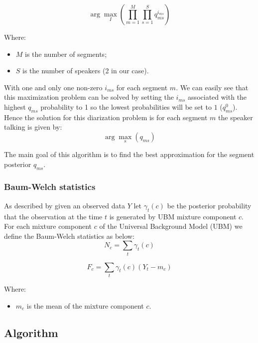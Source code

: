 \documentclass{techrep} %
\begin{document}
\begin{equation}\label{eq3}
  \arg\max_{I}(\prod_{m=1}^{M}{\prod_{s=1}^{S}{q_{ms}^{i_{ms}}}})
\end{equation}

Where:
\begin{itemize}
\item $M$ is the number of segments;
\item $S$ is the number of speakers (2 in our case).
\end{itemize}

With one and only one non-zero $i_{ms}$ for each segment $m$.  We can
easily see that this maximization problem can be solved by setting the
$i_{ms}$ associated with the highest $q_{ms}$ probability to 1 so the
lowest probabilities will be set to $1$ ($q_{ms}^0$). Hence the solution for this
diarization problem is for each segment $m$ the speaker talking is
given by:
\begin{equation}\label{eq6}
  \arg\max_{s}(q_{ms})
\end{equation}

The main goal of this algorithm is to find the best approximation for
the segment posterior $q_{ms}$.

\subsubsection{Baum-Welch statistics}

As described by \cite{BAUM} given an observed data $Y$ let
$\gamma_t(c)$ be the posterior probability that the observation at the
time $t$ is generated by UBM mixture component $c$.  For each mixture
component $c$ of the Universal Background Model (UBM) we define the
Baum-Welch statistics as below:
$$N_c = \sum_t{\gamma_t(c)}$$

$$F_c = \sum_t{\gamma_t(c)(Y_t - m_c)}$$

Where:
\begin{itemize}
\item $m_c$ is the mean of the mixture component $c$.
\end{itemize}

\subsection{Algorithm}

\newcommand{\argmax}[1]{\smash{\mathop{{\rm argmax}}\limits_{s}}\, #1}
\end{document}

